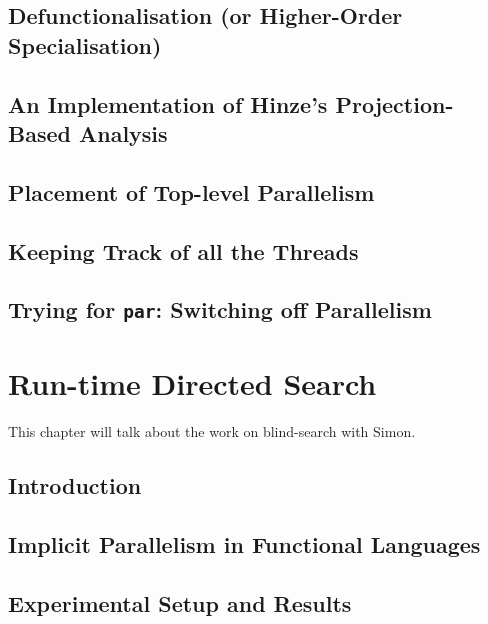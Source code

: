 \documentclass[justified, twoside, a4paper, symmetric]{tufte-book}
\begin{document}
    \section{Defunctionalisation (or Higher-Order Specialisation)}
    \label{sec:defunctionalisation}
    

    \section{An Implementation of Hinze's Projection-Based Analysis}
    \label{sec:hinzeImplementation}
    
    \section{Placement of Top-level Parallelism}
    \label{sec:parPlacement}
    

    \section{Keeping Track of all the Threads}
    \label{sec:logging}
    

    \section{Trying for \texttt{par}: Switching off Parallelism}
    \label{sec:parSwitching}
    

\chapter{Run-time Directed Search}

    This chapter will talk about the work on blind-search with Simon.

    \section{Introduction}
    

    \section{Implicit Parallelism in Functional Languages}
    \label{sec:blind-ParFunc}
    

    \section{Experimental Setup and Results}
    \label{sec:blind-Results}
    
\end{document}
